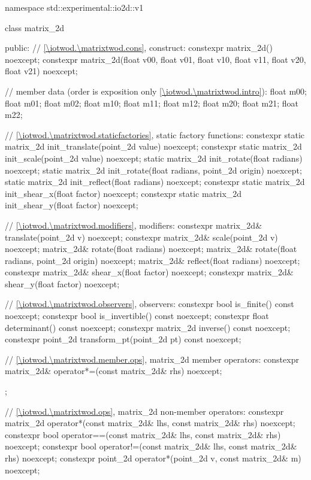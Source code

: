 \begin{codeblock}
namespace std::experimental::io2d::v1 {
  class matrix_2d {
  public:
    // \ref{\iotwod.\matrixtwod.cons}, construct:
    constexpr matrix_2d() noexcept;
    constexpr matrix_2d(float v00, float v01, float v10, float v11,
      float v20, float v21) noexcept;

    // member data (order is exposition only \ref{\iotwod.\matrixtwod.intro}):
    float m00;
    float m01;
    float m02;
    float m10;
    float m11;
    float m12;
    float m20;
    float m21;
    float m22;
    
    // \ref{\iotwod.\matrixtwod.staticfactories}, static factory functions:
    constexpr static matrix_2d init_translate(point_2d value) noexcept;
    constexpr static matrix_2d init_scale(point_2d value) noexcept;
    static matrix_2d init_rotate(float radians) noexcept;
    static matrix_2d init_rotate(float radians, point_2d origin) noexcept;
    static matrix_2d init_reflect(float radians) noexcept;
    constexpr static matrix_2d init_shear_x(float factor) noexcept;
    constexpr static matrix_2d init_shear_y(float factor) noexcept;
    
    // \ref{\iotwod.\matrixtwod.modifiers}, modifiers:
    constexpr matrix_2d& translate(point_2d v) noexcept;
    constexpr matrix_2d& scale(point_2d v) noexcept;
    matrix_2d& rotate(float radians) noexcept;
    matrix_2d& rotate(float radians, point_2d origin) noexcept;
    matrix_2d& reflect(float radians) noexcept;
    constexpr matrix_2d& shear_x(float factor) noexcept;
    constexpr matrix_2d& shear_y(float factor) noexcept;
    
    // \ref{\iotwod.\matrixtwod.observers}, observers:
    constexpr bool is_finite() const noexcept;
    constexpr bool is_invertible() const noexcept;
    constexpr float determinant() const noexcept;
    constexpr matrix_2d inverse() const noexcept;
    constexpr point_2d transform_pt(point_2d pt) const noexcept;
    
    // \ref{\iotwod.\matrixtwod.member.ops}, matrix_2d member operators:
    constexpr matrix_2d& operator*=(const matrix_2d& rhs) noexcept;
  };
    
  // \ref{\iotwod.\matrixtwod.ops}, matrix_2d non-member operators:
  constexpr matrix_2d operator*(const matrix_2d& lhs, const matrix_2d& rhs)
    noexcept;
  constexpr bool operator==(const matrix_2d& lhs, const matrix_2d& rhs)
    noexcept;
  constexpr bool operator!=(const matrix_2d& lhs, const matrix_2d& rhs)
    noexcept;
  constexpr point_2d operator*(point_2d v, const matrix_2d& m) 
    noexcept;
}
\end{codeblock}

